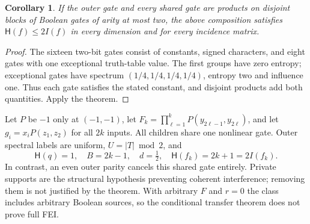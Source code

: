 \documentclass[11pt]{article}
\newtheorem{corollary}{Corollary}
\newcommand{\HH}{\mathsf H}
\begin{document}
\begin{corollary}
If the outer gate and every shared gate are products on disjoint blocks of Boolean gates of arity at most two, the above composition satisfies $\HH(f)\le2I(f)$ in every dimension and for every incidence matrix.
\end{corollary}
\begin{proof}
The sixteen two-bit gates consist of constants, signed characters, and eight gates with one exceptional truth-table value. The first groups have zero entropy; exceptional gates have spectrum $(1/4,1/4,1/4,1/4)$, entropy two and influence one. Thus each gate satisfies the stated constant, and disjoint products add both quantities. Apply the theorem.
\end{proof}
Let $P$ be $-1$ only at $(-1,-1)$, let $F_k=\prod_{\ell=1}^kP(y_{2\ell-1},y_{2\ell})$, and let $g_i=x_iP(z_1,z_2)$ for all $2k$ inputs. All children share one nonlinear gate. Outer spectral labels are uniform, $U=|T|\bmod2$, and
\[
\HH(q)=1,\quad B=2k-1,\quad d=\tfrac12,\quad
\HH(f_k)=2k+1=2I(f_k).
\]
In contrast, an even outer parity cancels this shared gate entirely. Private supports are the structural hypothesis preventing coherent interference; removing them is not justified by the theorem. With arbitrary $F$ and $r=0$ the class includes arbitrary Boolean sources, so the conditional transfer theorem does not prove full FEI.
\end{document}
